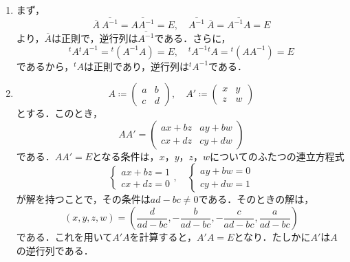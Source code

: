 \documentclass[uplatex,dvipdfmx,a4paper,10pt,fleqn]{jsarticle}
\begin{document}
    \begin{leftbar}
        \begin{enumerate}
            \item 
        まず，
        \[
            \overline{A} \ \overline{A^{-1}} = \overline{A A^{-1}}=E,\quad \overline{A^{-1}} \ \overline{A} =\overline{A^{-1} A}=E
        \]
        より，$\overline{A}$は正則で，逆行列は$\overline{A^{-1}}$である．さらに，
        \[
            {}^t A {}^t A^{-1} ={}^t (A^{-1} A)=E,\quad {}^t A^{-1} {}^t A = {}^t (A A^{-1})=E
        \]
        であるから，${}^t A$は正則であり，逆行列は${}^t A^{-1}$である．
        \item 
        \[
            A \coloneqq \begin{pmatrix} a & b \\ c & d \end{pmatrix},\quad A' \coloneqq \begin{pmatrix} x & y \\ z & w \end{pmatrix}
        \]
        とする．このとき，
        \[
            A A' = \begin{pmatrix} a x + b z & ay + bw \\ cx + dz & cy +dw \end{pmatrix}
        \]
        である．$AA'=E$となる条件は，$x$，$y$，$z$，$w$についてのふたつの連立方程式
        \[
            \begin{cases}
                ax+bz =1 \\
                cx+dz =0
            \end{cases}
            ,\quad 
            \begin{cases}
                ay+bw=0\\
                cy+dw=1
            \end{cases}
        \]
        が解を持つことで，その条件は$ad-bc \ne 0$である．そのときの解は，
        \[
            (x,y,z,w)=  (\frac{d}{ad-bc},-\frac{b}{ad-bc},-\frac{c}{ad-bc},\frac{a}{ad-bc})
        \]
        である．これを用いて$A'A$を計算すると，$A' A =E$となり．たしかに$A'$は$A$の逆行列である．
    

\end{enumerate}
\end{leftbar}
\end{document}
